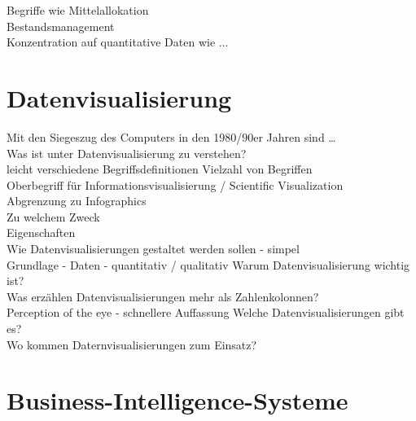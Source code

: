 \clearpage
Begriffe wie Mittelallokation\\
Bestandsmanagement\\
Konzentration auf quantitative Daten wie ...\\

\clearpage

\section{Datenvisualisierung}
Mit den Siegeszug des Computers in den 1980/90er Jahren sind \dots\\
Was ist unter Datenvisualisierung zu verstehen?\\
leicht verschiedene Begriffsdefinitionen
Vielzahl von Begriffen\\ 
Oberbegriff für Informationsvisualisierung / Scientific Visualization\\
Abgrenzung zu Infographics\\
Zu welchem Zweck\\
Eigenschaften\\
Wie Datenvisualisierungen gestaltet werden sollen - simpel\\
Grundlage - Daten - quantitativ / qualitativ
Warum Datenvisualisierung wichtig ist?\\
Was erzählen Datenvisualisierungen mehr als Zahlenkolonnen?\\
Perception of the eye - schnellere Auffassung
Welche Datenvisualisierungen gibt es?\\
Wo kommen Daternvisualisierungen zum Einsatz?\\






\clearpage
\section{Business-Intelligence-Systeme}

